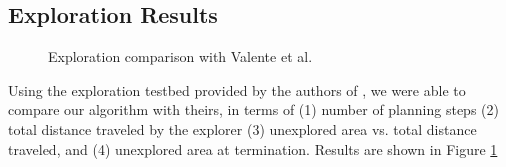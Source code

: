 \subsection{Exploration Results}
\begin{figure}
\centering
{}
\caption{Exploration comparison with Valente et al.\label{fig:valente}}
\end{figure}

Using the exploration testbed provided by the authors of \cite{valenteTS13}, 
we were able to compare our algorithm with theirs,
in terms of (1) number of planning steps (2) total distance traveled by the explorer (3) unexplored area {vs.} total distance traveled,
and (4) unexplored area at termination.  Results are shown in Figure \ref{fig:valente}